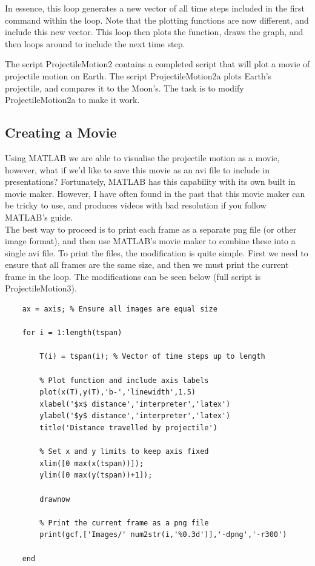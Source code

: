 \documentclass[12pt]{report}
\begin{document}
\noindent In essence, this loop generates a new vector of all time steps included in the first command within the loop. Note that the plotting functions are now different, and include this new vector. This loop then plots the function, draws the graph, and then loops around to include the next time step.\\

\begin{tcolorbox}[title=Task (Moderate)]
The script ProjectileMotion2 contains a completed script that will plot a movie of projectile motion on Earth. The script ProjectileMotion2a plots Earth's projectile, and compares it to the Moon's. The task is to modify ProjectileMotion2a to make it work.
\end{tcolorbox}

\subsection*{Creating a Movie}
Using MATLAB we are able to visualise the projectile motion as a movie, however, what if we'd like to save this movie as an avi file to include in presentations? Fortunately, MATLAB has this capability with its own built in movie maker. However, I have often found in the past that this movie maker can be tricky to use, and produces videos with bad resolution if you follow MATLAB's guide.\\

\noindent The best way to proceed is to print each frame as a separate png file (or other image format), and then use MATLAB's movie maker to combine these into a single avi file. To print the files, the modification is quite simple. First we need to ensure that all frames are the same size, and then we must print the current frame in the loop. The modifications can be seen below (full script is ProjectileMotion3).

\begin{lstlisting}
    ax = axis; % Ensure all images are equal size
    
    for i = 1:length(tspan)
    
        T(i) = tspan(i); % Vector of time steps up to length
        
        % Plot function and include axis labels
        plot(x(T),y(T),'b-','linewidth',1.5)
        xlabel('$x$ distance','interpreter','latex')
        ylabel('$y$ distance','interpreter','latex')
        title('Distance travelled by projectile')
        
        % Set x and y limits to keep axis fixed
        xlim([0 max(x(tspan))]);
        ylim([0 max(y(tspan))+1]);
        
        drawnow
        
        % Print the current frame as a png file
        print(gcf,['Images/' num2str(i,'%0.3d')],'-dpng','-r300') 
        
    end
\end{lstlisting}
\end{document}
